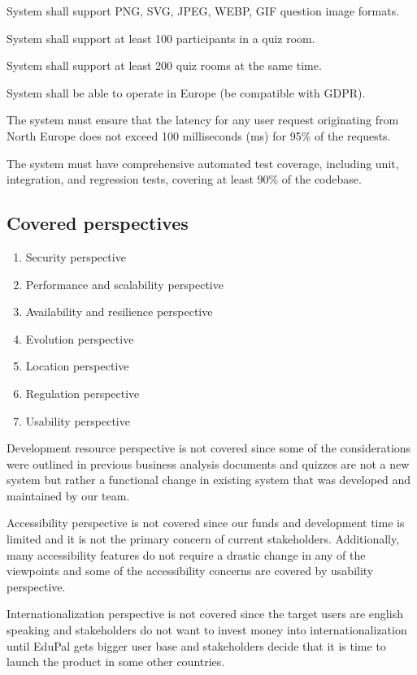 \begin{nfrlist}
    \item System shall support PNG, SVG, JPEG, WEBP, GIF question image formats.
    \item System shall support at least 100 participants in a quiz room.
    \item System shall support at least 200 quiz rooms at the same time.
    \item System shall be able to operate in Europe (be compatible with GDPR).
    \item The system must ensure that the latency for any user request originating from North Europe does not exceed 100 milliseconds (ms) for 95\% of the requests.
    \item The system must have comprehensive automated test coverage, including unit, integration, and regression tests, covering at least 90\% of the codebase.

\end{nfrlist}

\subsection{Covered perspectives}

\begin{enumerate}
    \item Security perspective
    \item Performance and scalability perspective
    \item Availability and resilience perspective
    \item Evolution perspective
    \item Location perspective
    \item Regulation perspective
    \item Usability perspective
\end{enumerate}

Development resource perspective is not covered since some of the considerations were outlined in previous business analysis documents and quizzes are not a new system but rather a functional change in existing system that was developed and maintained by our team.

Accessibility perspective is not covered since our funds and development time is limited and it is not the primary concern of current stakeholders. Additionally, many accessibility features do not require a drastic change in any of the viewpoints and some of the accessibility concerns are covered by usability perspective.

Internationalization perspective is not covered since the target users are english speaking and stakeholders do not want to invest money into internationalization until EduPal gets bigger user base and stakeholders decide that it is time to launch the product in some other countries.


